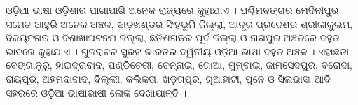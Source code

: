 \documentclass[a4paper,12pt,oneside,final]{article}
\begin{document}
ଓଡ଼ିଆ ଭାଷା ଓଡ଼ିଶାର ପାଖାପାଖି ଅନେକ ରାଜ୍ୟରେ କୁହାଯାଏ । ପଶ୍ଚିମବଙ୍ଗର ମେଦିନୀପୁର ସମେତ ଆହୁରି ଅନେକ ଅଞ୍ଚଳ, ଝାଡ଼ଖଣ୍ଡର ସିଂହଭୂମି ଜିଲ୍ଲା, ଆନ୍ଧ୍ର ପ୍ରଦେଶର ଶ୍ରୀକାକୁଲମ, ବିଜୟନଗର ଓ ବିଶାଖାପଟନମ ଜିଲ୍ଲା, ଛତିଶଗଡ଼ର ପୂର୍ବ ଜିଲ୍ଲା ଓ ନାଗପୁର ଅଞ୍ଚଳରେ ବହୁଳ ଭାବରେ କୁହାଯାଏ । ଗୁଜରାଟର ସୁରଟ ଭାରତର ଦ୍ୱିତୀୟ ଓଡ଼ିଆ ଭାଷା ବହୁଳ ଅଞ୍ଚଳ । ଏହାଛଡା ବେଙ୍ଗାଳୁରୁ, ହାଇଦ୍ରାବାଦ, ପଣ୍ଡିଚେରୀ, ଚେନ୍ନାଇ, ଗୋଆ, ମୁମ୍ବାଇ, ଜାମସେଦପୁର, ବରୋଦା, ରାୟପୁର, ଅହମଦାବାଦ, ଦିଲ୍ଲୀ, କଲିକତା, ଖଡ଼ଗପୁର, ଗୁଆହାଟୀ, ପୁନେ ଓ ସିଲଭାସା ଆଦି ସହରରେ ଓଡ଼ିଆ ଭାଷାଭାଷୀ ଲୋକ ଦେଖାଯାନ୍ତି ।
\end{document}

